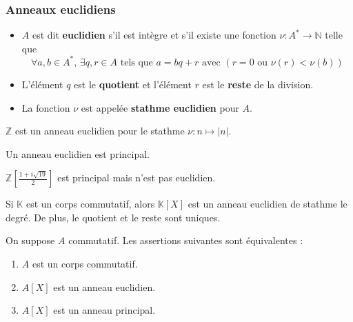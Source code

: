   \subsubsection{Anneaux euclidiens}


  \begin{definition}
    \begin{itemize}
      \item $A$ est dit \textbf{euclidien} s'il est intègre et s'il existe une fonction $\nu : A^* \rightarrow \mathbb{N}$ telle que
      \[ \forall a, b \in A^*, \, \exists q, r \in A \text{ tels que } a = bq+r \text{ avec } (r = 0 \text{ ou } \nu(r) < \nu(b)) \]
      \item L'élément $q$ est le \textbf{quotient} et l'élément $r$ est le \textbf{reste} de la division.
      \item La fonction $\nu$ est appelée \textbf{stathme euclidien} pour $A$.
    \end{itemize}
  \end{definition}

  \begin{example}
    $\mathbb{Z}$ est un anneau euclidien pour le stathme $\nu : n \mapsto \vert n \vert$.
  \end{example}

  \begin{proposition}
    Un anneau euclidien est principal.
  \end{proposition}


  \begin{cexample}
    $\mathbb{Z} \left[ \frac{1 + i\sqrt{19}}{2} \right]$ est principal mais n'est pas euclidien.
  \end{cexample}


  \begin{theorem}
    Si $\mathbb{K}$ est un corps commutatif, alors $\mathbb{K}[X]$ est un anneau euclidien de stathme le degré. De plus, le quotient et le reste sont uniques.
  \end{theorem}

  \begin{corollary}
    On suppose $A$ commutatif. Les assertions suivantes sont équivalentes :
    \begin{enumerate}[label={\bfseries(\roman*)}]
      \item $A$ est un corps commutatif.
      \item $A[X]$ est un anneau euclidien.
      \item $A[X]$ est un anneau principal.
    \end{enumerate}
  \end{corollary}

